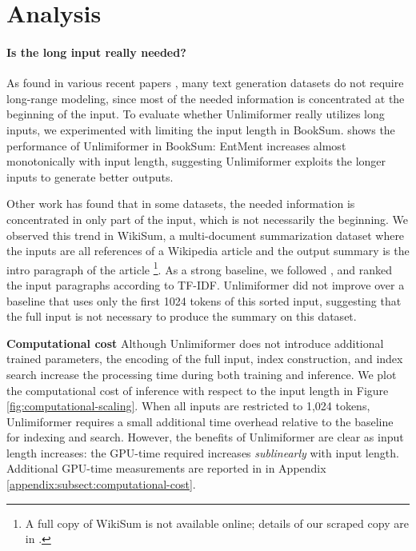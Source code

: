 \documentclass{article}
\newcommand{\ours}{Unlimiformer\xspace}
\begin{document}
\section{Analysis}
\label{sec:input-limitation}
\paragraph{Is the long input really needed?}
As found in various recent papers \citep{scrolls,kedzie-etal-2018-content}, many text generation datasets do not require long-range modeling, since most of the needed information is concentrated at the beginning of the input.
To evaluate whether \ours really utilizes long inputs, 
we experimented with limiting the input length in BookSum.
 shows the performance of \ours in BookSum: EntMent increases almost monotonically with input length, suggesting \ours exploits the longer inputs to generate better outputs.

Other work \citep{jiang-bansal-2019-avoiding} has found that in some datasets, the needed information is concentrated
in only part of the input, which is not necessarily the beginning.
We observed this trend in WikiSum, a multi-document summarization dataset where the inputs are all references of a Wikipedia article and the output summary is the intro paragraph of the article \citep{wikisum}\footnote{A full copy of WikiSum is not available online; details of our scraped copy are in .}. 
As a strong baseline, we followed \citet{wikisum}, and ranked the input paragraphs according to TF-IDF. 
\ours did not improve over a baseline that uses only the first 1024 tokens of this sorted input, suggesting that the full input is not necessary to produce the summary on this dataset. 

\textbf{Computational cost} \quad Although \ours does not introduce additional trained parameters, the encoding of the full input, index construction, and index search increase the processing time during both training and inference.
We plot the computational cost of inference with respect to the input length in Figure \ref{fig:computational-scaling}.
When all inputs are restricted to 1,024 tokens, \ours requires a small additional time overhead relative to the baseline for indexing and search. 
However, the benefits of \ours are clear as input length increases:
the GPU-time required increases \textit{sublinearly} with input length.
Additional GPU-time measurements are reported in 
in Appendix 
\ref{appendix:subsect:computational-cost}.
\end{document}
